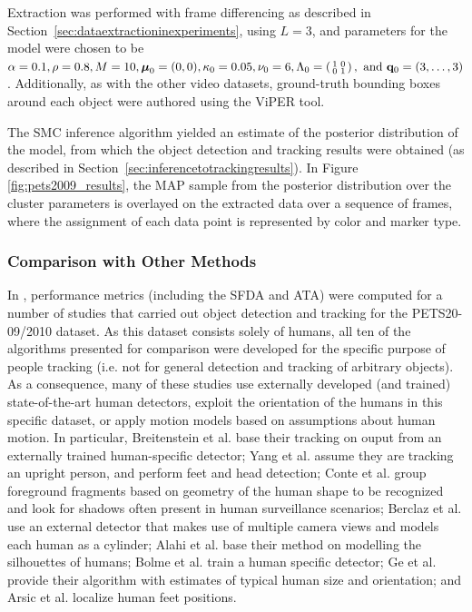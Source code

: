 \documentclass[twocolumn, final]{svjour3}
\begin{document}
Extraction was performed with frame differencing as described in Section~\ref{sec:dataextractioninexperiments}, using $L=3$, and parameters for the model were chosen to be $\alpha = 0.1, \rho = 0.8, M = 10, \boldsymbol{\mu}_{0} = (0,0), \kappa_{0} = 0.05, \nu_{0} = 6, \Lambda_{0} = \left( \begin{smallmatrix} 1&0\\ 0&1 \end{smallmatrix} \right), \text{ and } \bold{q}_{0} = (3, \ldots, 3)$. Additionally, as with the other video datasets, ground-truth bounding boxes around each object were authored using the ViPER tool.

The SMC inference algorithm yielded an estimate of the posterior distribution of the model, from which the object detection and tracking results were obtained (as described in Section~\ref{sec:inferencetotrackingresults}). In Figure \ref{fig:pets2009_results}, the MAP sample from the posterior distribution over the cluster parameters is overlayed on the extracted data over a sequence of frames, where the assignment of each data point is represented by color and marker type.


\subsubsection{Comparison with Other Methods}
\label{sec:comparisonwithothermethods}

In \cite{ellis_2010}, performance metrics (including the SFDA and ATA) were computed for a number of studies that carried out object detection and tracking for the PETS20-\\09/2010 dataset. As this dataset consists solely of humans, all ten of the algorithms presented for comparison were developed for the specific purpose of people tracking (i.e. not for general detection and tracking of arbitrary objects). As a consequence, many of these studies use externally developed (and trained) state-of-the-art human detectors, exploit the orientation of the humans in this specific dataset, or apply motion models based on assumptions about human motion. In particular, Breitenstein et al. \cite{breitenstein2009markovian} base their tracking on ouput from an externally trained human-specific detector; Yang et al. \cite{yang2009probabilistic} assume they are tracking an upright person, and perform feet and head detection; Conte et al. \cite{conte2010performance} group foreground fragments based on geometry of the human shape to be recognized and look for shadows often present in human surveillance scenarios; Berclaz et al. \cite{berclaz2009multiple} use an external detector that makes use of multiple camera views and models each human as a cylinder; Alahi et al. \cite{alahi2009sparsity} base their method on modelling the silhouettes of humans; Bolme et al. \cite{bolme2009simple} train a human specific detector; Ge et al. \cite{ge2009evaluation} provide their algorithm with estimates of typical human size and orientation; and Arsic et al. \cite{arsic2009multi} localize human feet positions.
\end{document}
